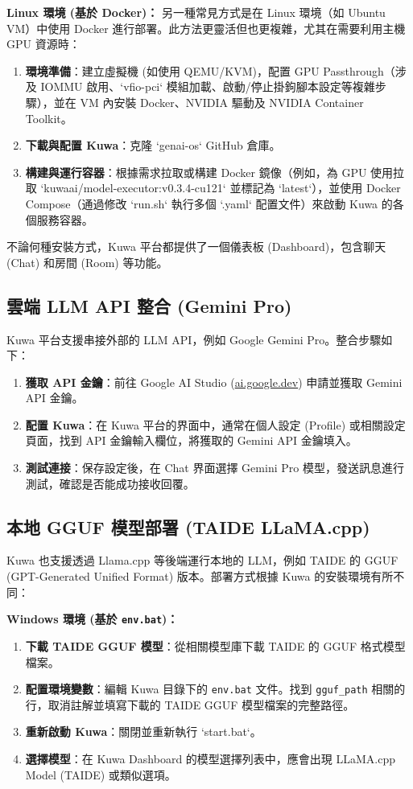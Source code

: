 \documentclass[twocolumn,11pt,a4paper]{article}
\begin{document}
\textbf{Linux 環境 (基於 Docker)：} %
另一種常見方式是在 Linux 環境（如 Ubuntu VM）中使用 Docker 進行部署。此方法更靈活但也更複雜，尤其在需要利用主機 GPU 資源時：
\begin{enumerate}[noitemsep, topsep=0pt]
    \item \textbf{環境準備}：建立虛擬機 (如使用 QEMU/KVM)，配置 GPU Passthrough（涉及 IOMMU 啟用、`vfio-pci` 模組加載、啟動/停止掛鉤腳本設定等複雜步驟），並在 VM 內安裝 Docker、NVIDIA 驅動及 NVIDIA Container Toolkit。
    \item \textbf{下載與配置 Kuwa}：克隆 `genai-os` GitHub 倉庫。
    \item \textbf{構建與運行容器}：根據需求拉取或構建 Docker 鏡像（例如，為 GPU 使用拉取 `kuwaai/model-executor:v0.3.4-cu121` 並標記為 `latest`），並使用 Docker Compose（通過修改 `run.sh` 執行多個 `.yaml` 配置文件）來啟動 Kuwa 的各個服務容器。
\end{enumerate}
不論何種安裝方式，Kuwa 平台都提供了一個儀表板 (Dashboard)，包含聊天 (Chat) 和房間 (Room) 等功能。

\subsection{雲端 LLM API 整合 (Gemini Pro)}
Kuwa 平台支援串接外部的 LLM API，例如 Google Gemini Pro。整合步驟如下：
\begin{enumerate}[noitemsep, topsep=0pt]
    \item \textbf{獲取 API 金鑰}：前往 Google AI Studio (\url{ai.google.dev}) 申請並獲取 Gemini API 金鑰。
    \item \textbf{配置 Kuwa}：在 Kuwa 平台的界面中，通常在個人設定 (Profile) 或相關設定頁面，找到 API 金鑰輸入欄位，將獲取的 Gemini API 金鑰填入。
    \item \textbf{測試連接}：保存設定後，在 Chat 界面選擇 Gemini Pro 模型，發送訊息進行測試，確認是否能成功接收回覆。
\end{enumerate}

\subsection{本地 GGUF 模型部署 (TAIDE LLaMA.cpp)}
Kuwa 也支援透過 Llama.cpp 等後端運行本地的 LLM，例如 TAIDE 的 GGUF (GPT-Generated Unified Format) 版本。部署方式根據 Kuwa 的安裝環境有所不同：

\textbf{Windows 環境 (基於 \texttt{env.bat})：}
\begin{enumerate}[noitemsep, topsep=0pt]
    \item \textbf{下載 TAIDE GGUF 模型}：從相關模型庫下載 TAIDE 的 GGUF 格式模型檔案。
    \item \textbf{配置環境變數}：編輯 Kuwa 目錄下的 \texttt{env.bat} 文件。找到 \texttt{gguf\_path} 相關的行，取消註解並填寫下載的 TAIDE GGUF 模型檔案的完整路徑。
    \item \textbf{重新啟動 Kuwa}：關閉並重新執行 `start.bat`。
    \item \textbf{選擇模型}：在 Kuwa Dashboard 的模型選擇列表中，應會出現 LLaMA.cpp Model (TAIDE) 或類似選項。
\end{enumerate}
\end{document}
